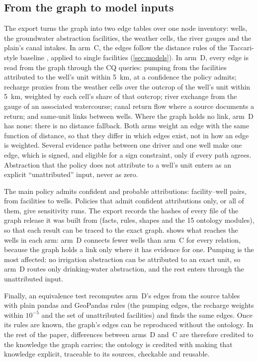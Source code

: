 \subsection{From the graph to model inputs}\label{sec:kg-export}

The export turns the graph into two edge tables over one node inventory: \nWells{} wells, the
groundwater abstraction facilities, the weather cells, the river gauges and the plain's canal
intakes. In arm~C, the edges follow the distance rules of the Taccari-style baseline
\citep{Taccari2024Spatial}, applied to single facilities (\cref{sec:models}). In arm~D, every edge
is read from the graph through the CQ queries: pumping from the facilities attributed to the
well's unit within \SI{5}{km}, at a confidence the policy admits; recharge proxies from the
weather cells over the outcrop of the well's unit within \SI{5}{km}, weighted by each cell's share
of that outcrop; river exchange from the gauge of an associated watercourse; canal return flow
where a source documents a return; and same-unit links between wells. Where the graph holds no
link, arm~D has none: there is no distance fallback. Both arms weight an edge with the same
function of distance, so that they differ in which edges exist, not in how an edge is weighted.
Several evidence paths between one driver and one well make one edge, which is signed, and
eligible for a sign constraint, only if every path agrees. Abstraction that the policy does not
attribute to a well's unit enters as an explicit ``unattributed'' input, never as zero.

The main policy admits confident and probable attributions: \nDPumpPairs{} facility--well pairs,
from \nDPumpFacilities{} facilities to \nDPumpWells{} wells. Policies that admit confident
attributions only, or all of them, give sensitivity runs. The export records the hashes of every
file of the graph release it was built from (facts, rules, shapes and the 15 ontology modules),
so that each result can be traced to the exact graph.  shows what reaches
the wells in each arm: arm~D connects fewer wells than arm~C for every relation, because the graph
holds a link only where it has evidence for one. Pumping is the most affected: no irrigation
abstraction can be attributed to an exact unit, so arm~D routes only drinking-water abstraction,
and the rest enters through the unattributed input.

Finally, an equivalence test recomputes arm~D's edges from the source tables with plain pandas
and GeoPandas rules (the pumping edges, the recharge weights within $10^{-5}$ and the set of
unattributed facilities) and finds the same edges. Once its rules are known, the graph's edges
can be reproduced without the ontology. In the rest of the paper, differences between arms~D
and~C are therefore credited to the knowledge the graph carries; the ontology is credited with
making that knowledge explicit, traceable to its sources, checkable and reusable.

